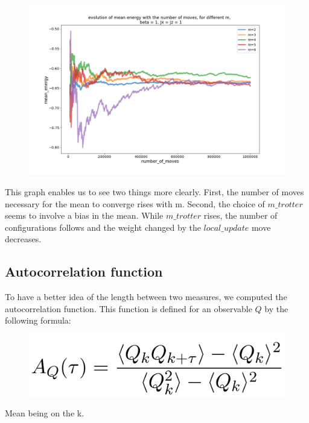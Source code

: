 \documentclass[a4paper,12pt,twoside]{article}
\begin{document}
	 \begin{figure}[!h]
	 	\centering
	 	\includegraphics[scale=0.4]{mean_energy_evolution_centerd_x=z=1_m2-6.png}
	 	\label{energy mean evolution}			
	 \end{figure}
	 This graph enables us to see two things more clearly.  First, the number of moves necessary for the mean to converge rises with m. Second, the choice of $m\_trotter$ seems to involve a bias in the mean.
	 While $m\_trotter$ rises, the number of configurations follows and the weight changed by the $local\_update$ move decreases.
	 
	 
	 \subsection{Autocorrelation function}
	 To have a better idea of the length between two measures, we computed the autocorrelation function. This function is defined for an observable $Q$ by the following formula:
	\begin{figure}[!h]
	 	\centering
	 	\includegraphics[scale=0.25]{autocorformula.png}
	\end{figure}
		
	Mean being on the k.
	
\end{document}
